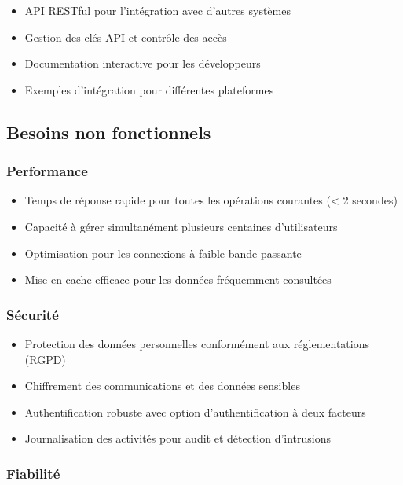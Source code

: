\begin{itemize}
  \item API RESTful pour l'intégration avec d'autres systèmes
  \item Gestion des clés API et contrôle des accès
  \item Documentation interactive pour les développeurs
  \item Exemples d'intégration pour différentes plateformes
\end{itemize}

\subsection{Besoins non fonctionnels}

\subsubsection{Performance}

\begin{itemize}
  \item Temps de réponse rapide pour toutes les opérations courantes (< 2 secondes)
  \item Capacité à gérer simultanément plusieurs centaines d'utilisateurs
  \item Optimisation pour les connexions à faible bande passante
  \item Mise en cache efficace pour les données fréquemment consultées
\end{itemize}

\subsubsection{Sécurité}

\begin{itemize}
  \item Protection des données personnelles conformément aux réglementations (RGPD)
  \item Chiffrement des communications et des données sensibles
  \item Authentification robuste avec option d'authentification à deux facteurs
  \item Journalisation des activités pour audit et détection d'intrusions
\end{itemize}

\subsubsection{Fiabilité}

